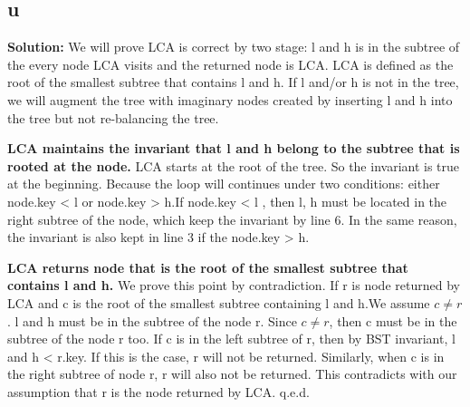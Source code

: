 \documentclass[12pt]{article}%
\begin{document}
\subsection{u}
\textbf{Solution:} We will prove LCA is correct by two stage: l and h is in the subtree of the every node LCA visits and the returned node is LCA. LCA is defined as the root of the smallest subtree that contains l and h. If l and/or h is not in the tree, we will augment the tree with imaginary nodes created by inserting l and h into the tree but not re-balancing the tree. \par

\textbf{LCA maintains the invariant that l and h belong to the subtree that is rooted at the node.} LCA starts at the root of the tree. So the invariant is true at the beginning. Because the loop will continues under  two conditions: either node.key < l or node.key > h.If node.key < l , then l, h must be located in the right subtree of the node, which keep the invariant by line 6. In the same reason, the invariant is also kept in line 3 if the node.key > h.

\textbf{LCA returns node that is the root of the smallest subtree that contains l and h.} We prove this point by contradiction.
If r is node returned by LCA and c is the root of the smallest subtree containing l and h.We assume $c \ne r$. l and h must be in the subtree of the node r. Since $c \ne r$, then c must be in the subtree of the node r too. If c is in the left subtree of r, then by BST invariant, l and h < r.key. If this is the case, r will not be returned. Similarly, when c is in the right subtree of node r, r will also not be returned.
This contradicts with our assumption that r is the node returned by LCA. q.e.d.
\end{document}
